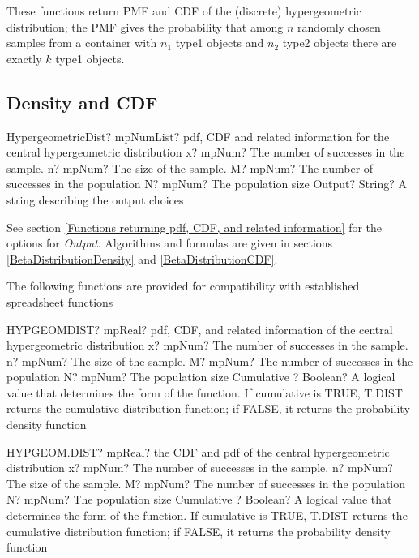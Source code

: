 These functions return PMF and CDF of the (discrete) hypergeometric distribution;
the PMF gives the probability that among $n$ randomly chosen samples from a container
with $n_1$ type1 objects and $n_2$ type2 objects there are exactly $k$ type1 objects.



\subsection{Density and CDF}

\begin{mpFunctionsExtract}
	\mpFunctionFiveNotImplemented
	{HypergeometricDist? mpNumList? pdf, CDF and related information for the central hypergeometric distribution}
	{x? mpNum? The number of successes in the sample.}
	{n? mpNum? The size of the sample.}
	{M? mpNum? The number of successes in the population}
	{N? mpNum? The population size}
	{Output? String? A string describing the output choices}
\end{mpFunctionsExtract}


\vspace{0.3cm}
See section \ref{Functions returning pdf, CDF, and related information} for the options for {\itshape\sffamily Output}. Algorithms and formulas are given in sections \ref{BetaDistributionDensity} and \ref{BetaDistributionCDF}.


\vspace{0.3cm}

The following functions are provided for compatibility with established spreadsheet functions

\vspace{0.6cm}
\begin{mpFunctionsExtract}
	\mpWorksheetFunctionFiveNotImplemented
	{HYPGEOMDIST? mpReal? pdf, CDF, and related information of the central hypergeometric distribution}
	{x? mpNum? The number of successes in the sample.}
	{n? mpNum? The size of the sample.}
	{M? mpNum? The number of successes in the population}
	{N? mpNum? The population size}
	{Cumulative ? Boolean? A logical value that determines the form of the function. If cumulative is TRUE, T.DIST returns the cumulative distribution function; if FALSE, it returns the probability density function}
\end{mpFunctionsExtract}


\vspace{0.6cm}
\begin{mpFunctionsExtract}
	\mpWorksheetFunctionFiveNotImplemented
	{HYPGEOM.DIST? mpReal? the CDF and pdf of the central hypergeometric distribution}
	{x? mpNum? The number of successes in the sample.}
	{n? mpNum? The size of the sample.}
	{M? mpNum? The number of successes in the population}
	{N? mpNum? The population size}
	{Cumulative ? Boolean? A logical value that determines the form of the function. If cumulative is TRUE, T.DIST returns the cumulative distribution function; if FALSE, it returns the probability density function}
\end{mpFunctionsExtract}




